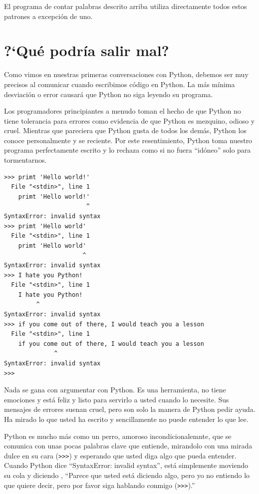 El programa de contar palabras descrito arriba utiliza directamente todos estos patrones a excepci\'on de uno.

\section{?`Qu\'e podr\'ia salir mal?}

Como vimos en nuestras primeras conversaciones con Python, debemos ser muy precisos al comunicar cuando escribimos c\'odigo en Python. La m\'as m\'inima desviaci\'on o error causar\'a que Python no siga leyendo su programa.

Los programadores principiantes a menudo toman el hecho de que Python no tiene tolerancia para errores como evidencia de que Python es mezquino, odioso y cruel.
Mientras que pareciera que Python gusta de todos los dem\'as, Python los conoce personalmente y se reciente. Por este resentimiento, Python toma nuestro programa perfectamente escrito y lo rechaza como si no fuera ``id\'oneo'' solo para tormentarnos.

\beforeverb
\begin{verbatim}
>>> primt 'Hello world!'
  File "<stdin>", line 1
    primt 'Hello world!'
                       ^
SyntaxError: invalid syntax
>>> primt 'Hello world'
  File "<stdin>", line 1
    primt 'Hello world'
                      ^
SyntaxError: invalid syntax
>>> I hate you Python!
  File "<stdin>", line 1
    I hate you Python!
         ^
SyntaxError: invalid syntax
>>> if you come out of there, I would teach you a lesson
  File "<stdin>", line 1
    if you come out of there, I would teach you a lesson
              ^
SyntaxError: invalid syntax
>>> 
\end{verbatim}
\afterverb
%
Nada se gana con argumentar con Python. Es una herramienta,
no tiene emociones y est\'a feliz y listo para servirlo a usted cuando lo necesite. Sus mensajes de errores suenan cruel, pero son solo la manera de Python pedir ayuda. Ha mirado lo que usted ha escrito y sencillamente no puede entender lo que lee.

Python es mucho m\'as como un perro, amoroso incondicionalemnte, que se comunica con unas pocas palabras clave que entiende, mir\;andolo con una mirada dulce en su cara ({\tt >>>}) y esperando que usted diga algo que pueda entender.
Cuando Python dice ``SyntaxError: invalid syntax'', est\'a simplemente moviendo su cola y diciendo , ``Parece que usted est\'a diciendo algo, pero yo no entiendo lo que quiere decir, pero por favor siga hablando conmigo ({\tt >>>}).''


